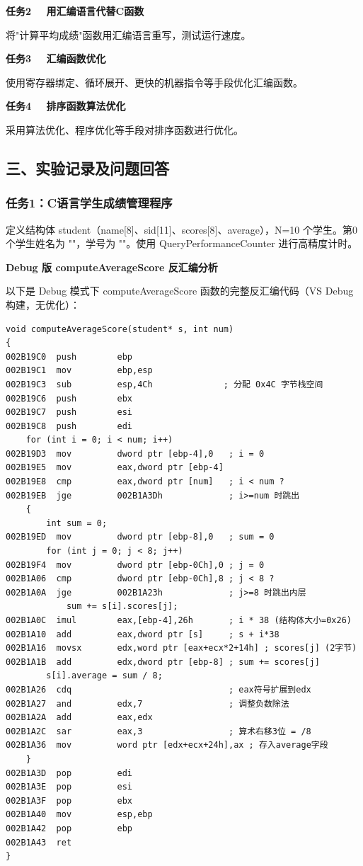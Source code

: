 \textbf{任务2 \ \ 用汇编语言代替C函数}

将"计算平均成绩"函数用汇编语言重写，测试运行速度。

\textbf{任务3 \ \ 汇编函数优化}

使用寄存器绑定、循环展开、更快的机器指令等手段优化汇编函数。

\textbf{任务4 \ \ 排序函数算法优化}

采用算法优化、程序优化等手段对排序函数进行优化。

\subsection*{三、实验记录及问题回答}

\subsubsection*{任务1：C语言学生成绩管理程序}

定义结构体 student（name[8]、sid[11]、scores[8]、average），N=10 个学生。第0个学生姓名为 "\studentname"，学号为 "\studentid"。使用 QueryPerformanceCounter 进行高精度计时。

\textbf{Debug 版 computeAverageScore 反汇编分析}

以下是 Debug 模式下 computeAverageScore 函数的完整反汇编代码（VS Debug 构建，无优化）：

\begin{lstlisting}
void computeAverageScore(student* s, int num)
{
002B19C0  push        ebp
002B19C1  mov         ebp,esp
002B19C3  sub         esp,4Ch              ; 分配 0x4C 字节栈空间
002B19C6  push        ebx
002B19C7  push        esi
002B19C8  push        edi
    for (int i = 0; i < num; i++)
002B19D3  mov         dword ptr [ebp-4],0   ; i = 0
002B19E5  mov         eax,dword ptr [ebp-4]
002B19E8  cmp         eax,dword ptr [num]   ; i < num ?
002B19EB  jge         002B1A3Dh             ; i>=num 时跳出
    {
        int sum = 0;
002B19ED  mov         dword ptr [ebp-8],0   ; sum = 0
        for (int j = 0; j < 8; j++)
002B19F4  mov         dword ptr [ebp-0Ch],0 ; j = 0
002B1A06  cmp         dword ptr [ebp-0Ch],8 ; j < 8 ?
002B1A0A  jge         002B1A23h             ; j>=8 时跳出内层
            sum += s[i].scores[j];
002B1A0C  imul        eax,[ebp-4],26h       ; i * 38 (结构体大小=0x26)
002B1A10  add         eax,dword ptr [s]     ; s + i*38
002B1A16  movsx       edx,word ptr [eax+ecx*2+14h] ; scores[j] (2字节)
002B1A1B  add         edx,dword ptr [ebp-8] ; sum += scores[j]
        s[i].average = sum / 8;
002B1A26  cdq                               ; eax符号扩展到edx
002B1A27  and         edx,7                 ; 调整负数除法
002B1A2A  add         eax,edx
002B1A2C  sar         eax,3                 ; 算术右移3位 = /8
002B1A36  mov         word ptr [edx+ecx+24h],ax ; 存入average字段
    }
002B1A3D  pop         edi
002B1A3E  pop         esi
002B1A3F  pop         ebx
002B1A40  mov         esp,ebp
002B1A42  pop         ebp
002B1A43  ret
}
\end{lstlisting}

